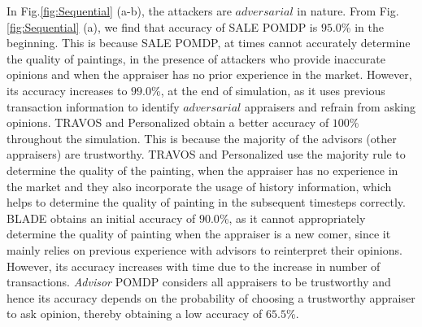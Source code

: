 \documentclass{aamas2014}
\providecommand{\SALEP}{SALE POMDP}
\begin{document}
In Fig.\ref{fig:Sequential} (a-b), the attackers are $adversarial$ in nature.  From Fig.\ref{fig:Sequential} (a), we find that accuracy of \SALEP{} is $95.0$\% in the beginning. This is because \SALEP{}, at times cannot accurately determine the quality of paintings, in the presence of attackers who provide inaccurate opinions and when the appraiser has no prior experience in the market. However, its accuracy increases to $99.0$\%, at the end of simulation, as it uses previous transaction information to identify $adversarial$ appraisers and refrain from asking opinions. TRAVOS and Personalized obtain a better accuracy of $100$\% throughout the simulation. This is because the majority of the advisors (other appraisers) are trustworthy. TRAVOS and Personalized use the majority rule to determine the quality of the painting, when the appraiser has no experience in the market and they also incorporate the usage of history information, which helps to determine the quality of painting in the subsequent timesteps correctly. BLADE obtains an initial accuracy of $90.0$\%, as it cannot appropriately determine the quality of  painting when the appraiser is a new comer, since it mainly relies on previous experience with advisors to reinterpret their opinions. However, its accuracy increases with time due to the increase in number of transactions. \textit{Advisor} POMDP considers all appraisers to be trustworthy and hence its accuracy depends on the probability of choosing a trustworthy appraiser to ask opinion, thereby obtaining a low accuracy of  $65.5$\%.
\end{document}
